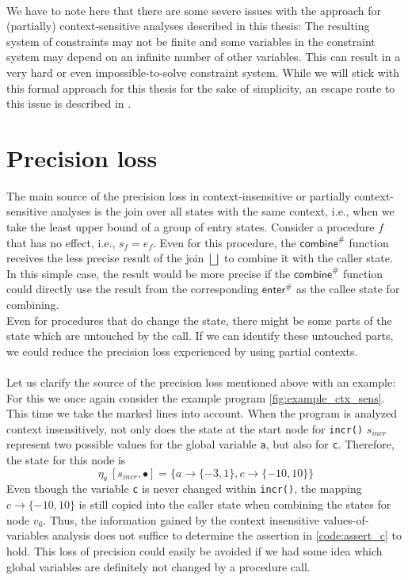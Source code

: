     \\
    We have to note here that there are some severe issues with the approach for (partially) context-sensitive analyses described in this thesis: The resulting system of constraints may not be finite and some variables in the constraint system may depend on an infinite number of other variables. This can result in a very hard or even impossible-to-solve constraint system. While we will stick with this formal approach for this thesis for the sake of simplicity, an escape route to this issue is described in \parencite{apinis2012side}.

  \section{Precision loss}\label{section:precisionLoss}
    The main source of the precision loss in context-insensitive or partially context-sensitive analyses is the join over all states with the same context, i.e., when we take the least upper bound of a group of entry states. Consider a procedure $f$ that has no effect, i.e., $s_f = e_f$. Even for this procedure, the $\textsf{combine}^{\#}$ function receives the less precise result of the join $\bigsqcup$ to combine it with the caller state. In this simple case, the result would be more precise if the $\textsf{combine}^{\#}$ function could directly use the result from the corresponding $\textsf{enter}^{\#}$ as the callee state for combining.\\
    Even for procedures that do change the state, there might be some parts of the state which are untouched by the call. If we can identify these untouched parts, we could reduce the precision loss experienced by using partial contexts.\\
    \\
    Let us clarify the source of the precision loss mentioned above with an example: For this we once again consider the example program \autoref{fig:example_ctx_sens}. This time we take the marked lines into account. When the program is analyzed context insensitively, not only does the state at the start node for \texttt{incr()} $s_{incr}$ represent two possible values for the global variable \texttt{a}, but also for \texttt{c}. Therefore, the state for this node is
    \[\eta_\textsf{v}\ [s_{incr}, \bullet] = \{a \rightarrow \{-3, 1\}, c \rightarrow \{-10, 10\}\} \]
    Even though the variable \texttt{c} is never changed within \texttt{incr()}, the mapping $c \rightarrow \{-10, 10\}$ is still copied into the caller state when combining the states for node $v_6$. Thus, the information gained by the context insensitive values-of-variables analysis does not suffice to determine the assertion in \autoref{code:assert_c} to hold. This loss of precision could easily be avoided if we had some idea which global variables are definitely not changed by a procedure call.


